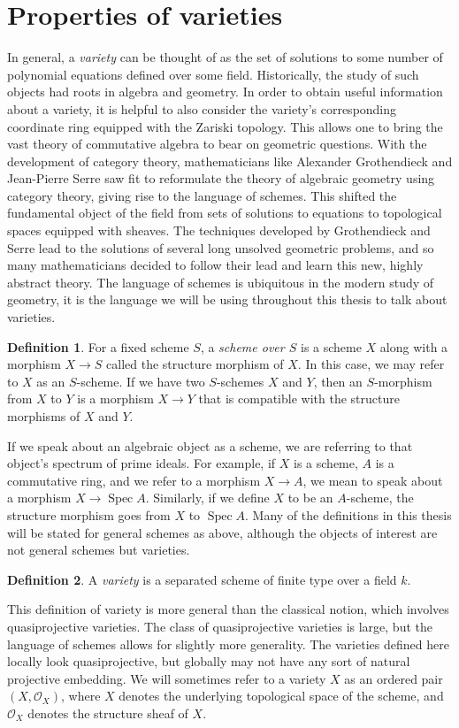 \documentclass[12pt,twoside]{reedthesis}
\theoremstyle{plain}
\theoremstyle{definition}
\newtheorem{definition}{Definition}[section]
\theoremstyle{remark}
\newcommand{\calO}{\mathcal{O}}
\newcommand{\Spec}{\operatorname{Spec}}
\begin{document}
\section{Properties of varieties}
In general, a \emph{variety} can be thought of as the set of solutions to some number of polynomial equations defined over some field. Historically, the study of such objects had roots in algebra and geometry. In order to obtain useful information about a variety, it is helpful to also consider the variety's corresponding coordinate ring equipped with the Zariski topology. This allows one to bring the vast theory of commutative algebra to bear on geometric questions. With the development of category theory, mathematicians like Alexander Grothendieck and Jean-Pierre Serre saw fit to reformulate the theory of algebraic geometry using category theory, giving rise to the language of schemes. This shifted the fundamental object of the field from sets of solutions to equations to topological spaces equipped with sheaves. The techniques developed by Grothendieck and Serre lead to the solutions of several long unsolved geometric problems, and so many mathematicians decided to follow their lead and learn this new, highly abstract theory. The language of schemes is ubiquitous in the modern study of geometry, it is the language we will be using throughout this thesis to talk about varieties.
\begin{definition}
For a fixed scheme $S$, a \emph{scheme over $S$} is a scheme $X$ along with a morphism $X\to S$ called the structure morphism of $X$. In this case, we may refer to $X$ as an $S$-scheme. If we have two $S$-schemes $X$ and $Y$, then an $S$-morphism from $X$ to $Y$ is a morphism $X\to Y$ that is compatible with the structure morphisms of $X$ and $Y$.\label{schemeOverDef}
\end{definition}
\noindent If we speak about an algebraic object as a scheme, we are referring to that object's spectrum of prime ideals. For example, if $X$ is a scheme, $A$ is a commutative ring, and we refer to a morphism $X\to A$, we mean to speak about a morphism $X\to\Spec A$. Similarly, if we define $X$ to be an $A$-scheme, the structure morphism goes from $X$ to $\Spec A$. Many of the definitions in this thesis will be stated for general schemes as above, although the objects of interest are not general schemes but varieties.
\begin{definition}
A \emph{variety} is a separated scheme of finite type over a field $k$. \label{varDef}
\end{definition}
This definition of variety is more general than the classical notion, which involves quasiprojective varieties. The class of quasiprojective varieties is large, but the language of schemes allows for slightly more generality. The varieties defined here locally look quasiprojective, but globally may not have any sort of natural projective embedding. We will sometimes refer to a variety $X$ as an ordered pair $(X,\calO_X)$, where $X$ denotes the underlying topological space of the scheme, and $\calO_X$ denotes the structure sheaf of $X$. 
\end{document}
